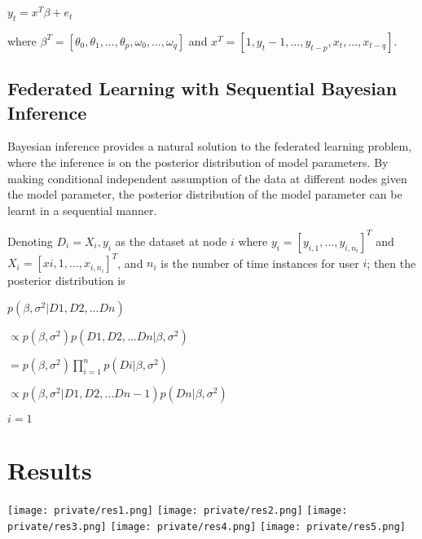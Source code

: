 \documentclass[journal,transmag]{IEEEtran}
\begin{document}
\begin{center}
  $y_t = x^T \beta + e_t$
\end{center}

where $\beta^T = [\theta_0, \theta_1 ,... , \theta_p ,\omega_0 ,... ,\omega_q ]$ and $x^T = [1, y_t-1,... , y_{t-p} , x_t ,... , x_{t-q }]$.

\subsection{ Federated Learning with Sequential Bayesian Inference}

Bayesian inference provides a natural solution to the federated learning problem, where the inference is on the posterior distribution of model parameters. By making conditional independent assumption of the data at different nodes given the model parameter, the posterior distribution of the model parameter can be learnt in a sequential manner.

Denoting $D_i = {X_i, y_i}$ as the dataset at node $i$ where $y_i = [y_{i,1} ,... , y_{i,n_i}]^T$ and $X_i = [x{i,1} ,... , x_{i,n_i} ]^T$, and $n_i$ is the number of time instances for user $i$; then the posterior distribution is

$p(\beta, \sigma^2 | D1 , D2 ,... Dn ) $

$\propto p(\beta, \sigma^2)p(D1, D2 ,... Dn | \beta, \sigma^2)$

$ = p(\beta, \sigma^2) \prod_{i=1}^n p(Di |\beta, \sigma^ 2 )$

$ \propto p(\beta, \sigma^2|D1, D2 ,... Dn-1 )p(Dn|\beta, \sigma^ 2 )$

$i=1$

\section{Results}

\begin{center}
  \texttt{[image: private/res1.png]}
  \vspace{2em}
  \texttt{[image: private/res2.png]}
  \vspace{2em}
  \texttt{[image: private/res3.png]}
  \vspace{2em}
  \texttt{[image: private/res4.png]}
  \vspace{2em}
  \texttt{[image: private/res5.png]}
\end{center}
\end{document}
